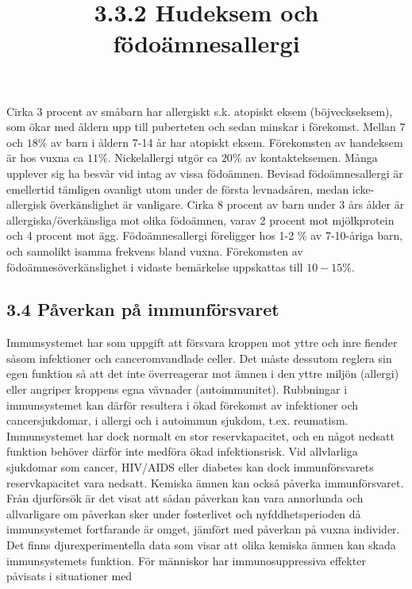 \title{
3.3.2 Hudeksem och födoämnesallergi
}
Cirka 3 procent av småbarn har allergiskt s.k. atopiskt eksem (böjveckseksem), som ökar med åldern upp till puberteten och sedan minskar i förekomst. Mellan 7 och \(18 \%\) av barn i åldern 7-14 år har atopiskt eksem. Förekomsten av handeksem är hos vuxna ca \(11 \%\). Nickelallergi utgör ca \(20 \%\) av kontakteksemen.
Många upplever sig ha besvår vid intag av vissa födoämnen. Bevisad födoämnesallergi är emellertid tämligen ovanligt utom under de första levnadsåren, medan icke-allergisk överkänslighet är vanligare. Cirka 8 procent av barn under 3 års ålder är allergiska/överkänsliga mot olika födoämnen, varav 2 procent mot mjölkprotein och 4 procent mot ägg. Födoämnesallergi föreligger hos 1-2 \% av 7-10-åriga barn, och sannolikt isamma frekvens bland vuxna. Förekomsten av födoämnesöverkänslighet i vidaste bemärkelse uppskattas till \(10-15 \%\).
\subsection*{3.4 Påverkan på immunförsvaret}
Immunsystemet har som uppgift att försvara kroppen mot yttre och inre fiender såsom infektioner och canceromvandlade celler. Det måste dessutom reglera sin egen funktion så att det inte överreagerar mot ämnen i den yttre miljön (allergi) eller angriper kroppens egna vävnader (autoimmunitet). Rubbningar i immunsystemet kan därför resultera i ökad förekomst av infektioner och cancersjukdomar, i allergi och i autoimmun sjukdom, t.ex. reumatism. Immunsystemet har dock normalt en stor reservkapacitet, och en något nedsatt funktion behöver därför inte medföra ökad infektionsrisk. Vid allvlarliga sjukdomar som cancer, HIV/AIDS eller diabetes kan dock immunförsvarets reservkapacitet vara nedsatt.
Kemiska ämnen kan också påverka immunförsvaret. Från djurförsök är det visat att sådan påverkan kan vara annorlunda och allvarligare om påverkan sker under fosterlivet och nyfddhetsperioden då immunsystemet fortfarande är omget, jämfört med påverkan på vuxna individer.
Det finns djurexperimentella data som visar att olika kemiska ämnen kan skada immunsystemets funktion. För människor har immunosuppressiva effekter påvisats i situationer med

